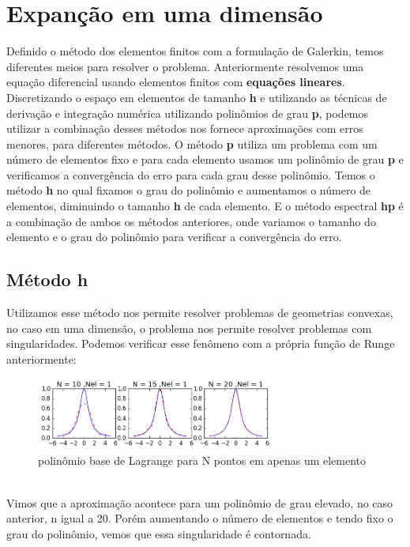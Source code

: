 \chapter{Expanção em uma dimensão}
 Definido o método dos elementos finitos com a formulação de Galerkin, temos diferentes meios para resolver o problema. Anteriormente resolvemos uma equação diferencial usando elementos finitos com \textbf{equações lineares}. Discretizando o espaço em elementos de tamanho \textbf{h} e utilizando as técnicas de derivação e integração numérica utilizando polinômios de grau \textbf{p}, podemos utilizar a combinação desses métodos nos fornece aproximações com erros menores, para diferentes métodos.
 O método \textbf{p} utiliza um problema com um número de elementos fixo e para cada elemento usamos um  polinômio de grau \textbf{p} e verificamos a convergência do erro para cada grau desse polinômio. Temos o método \textbf{h} no qual fixamos o grau do polinômio e aumentamos o número de elementos, diminuindo o tamanho \textbf{h} de cada elemento.
 E o método espectral \textbf{hp} é a combinação de ambos os métodos anteriores, onde variamos o tamanho do elemento e o grau do polinômio para verificar a convergência do erro. 
 \section{Método h}
 Utilizamos esse método nos permite resolver problemas de geometrias convexas, no caso em uma dimensão, o problema nos permite resolver problemas com singularidades. Podemos verificar esse fenômeno com a própria função de Runge anteriormente:
\begin{figure}[!h]
\includegraphics[width=0.7\textwidth, center ]{figuras/compara_metodo_n.png}
\caption{polinômio base de Lagrange para N  pontos em apenas um elemento}
\end{figure}
\\ Vimos que a aproximação acontece para um polinômio de grau elevado, no caso anterior, n igual a 20. Porém  aumentando o número de elementos e tendo fixo o grau do polinômio, vemos que essa singularidade é contornada.


 
